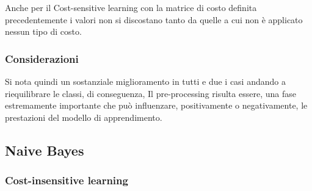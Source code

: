 \documentclass[italian,12pt,a4paper]{article}
\begin{document}
	Anche per il Cost-sensitive learning con la matrice di costo definita precedentemente i valori non si discostano tanto da quelle a cui non è applicato nessun tipo di costo.
	
	\subsubsection{Considerazioni}
	Si nota quindi un sostanziale miglioramento in tutti e due i casi andando a riequilibrare le classi, di conseguenza, Il pre-processing risulta essere, una fase estremamente importante che può
	influenzare, positivamente o negativamente, le prestazioni del modello di apprendimento.
	
	\subsection{Naive Bayes}
	
	\subsubsection{Cost-insensitive learning}
	
\end{document}
